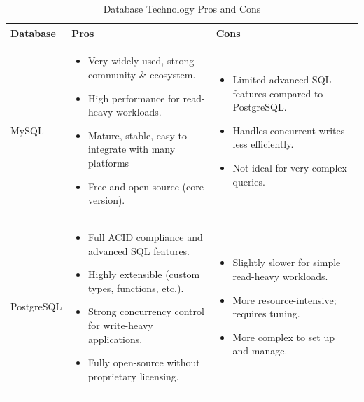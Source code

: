 \begin{longtable}{|p{3cm}|p{6cm}|p{6cm}|}
\caption{Database Technology Pros and Cons} \\
\hline
\textbf{Database} & \textbf{Pros} & \textbf{Cons} \\
\hline

MySQL &
\begin{itemize}[leftmargin=*,noitemsep,nolistsep]
  \item Very widely used, strong community \& ecosystem.
  \item High performance for read-heavy workloads.
  \item Mature, stable, easy to integrate with many platforms
  \item Free and open-source (core version).
\end{itemize}
&
\begin{itemize}[leftmargin=*,noitemsep,nolistsep]
  \item Limited advanced SQL features compared to PostgreSQL.
  \item Handles concurrent writes less efficiently.
  \item Not ideal for very complex queries.
\end{itemize}
\\ \hline

PostgreSQL &
\begin{itemize}[leftmargin=*,noitemsep,nolistsep]
  \item Full ACID compliance and advanced SQL features.
  \item Highly extensible (custom types, functions, etc.).
  \item Strong concurrency control for write-heavy applications.
  \item Fully open-source without proprietary licensing.
\end{itemize}
&
\begin{itemize}[leftmargin=*,noitemsep,nolistsep]
  \item Slightly slower for simple read-heavy workloads.
  \item More resource-intensive; requires tuning.
  \item More complex to set up and manage.
\end{itemize}
\\ \hline


\end{longtable}
